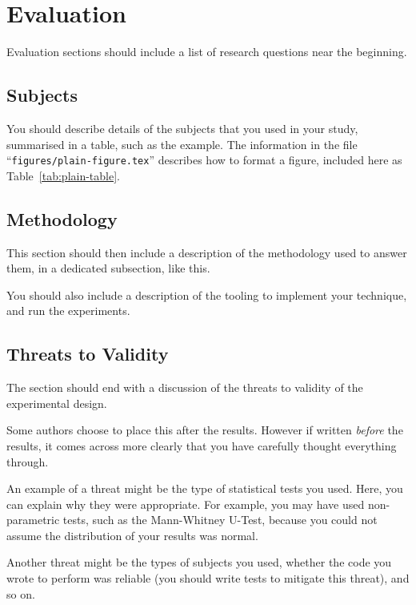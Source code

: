 \section{Evaluation}
\label{sec:evaluation}

Evaluation sections should include a list of
research questions near the beginning.


\subsection{Subjects}
\label{sec:subjects}

You should describe details of the subjects that
you used in your study, summarised in a table,
such as the example.
The information in the file
``{\tt figures/plain-figure.tex}''
describes how to format a figure, included here as
Table~\ref{tab:plain-table}.



\subsection{Methodology}
\label{sec:methodology}

This section should then include a description of
the methodology used to answer them, in a dedicated
subsection, like this.

You should also include a description of the tooling
to implement your technique, and run the experiments.



\subsection{Threats to Validity}
\label{sec:threats-to-validity}

The section should end with a discussion of the threats
to validity of the experimental design.

Some authors choose to place this after the results.
However if written {\em before} the results, it comes
across more clearly that you have carefully thought
everything through.

An example of a threat might be the type of
statistical tests you used. Here, you can explain
why they were appropriate. For example, you may
have used non-parametric tests, such as the
Mann-Whitney U-Test, because you could not assume
the distribution of your results was normal.

Another threat might be the types of subjects you
used, whether the code you wrote to perform was
reliable (you should write tests to mitigate this
threat), and so on.
